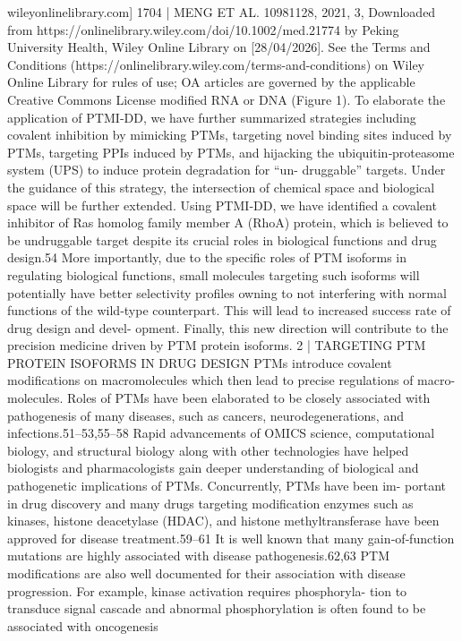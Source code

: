 wileyonlinelibrary.com]
1704 |
MENG ET AL.
 10981128, 2021, 3, Downloaded from https://onlinelibrary.wiley.com/doi/10.1002/med.21774 by Peking University Health, Wiley Online Library on [28/04/2026]. See the Terms and Conditions (https://onlinelibrary.wiley.com/terms-and-conditions) on Wiley Online Library for rules of use; OA articles are governed by the applicable Creative Commons License
modified RNA or DNA (Figure 1). To elaborate the application of PTMI‐DD, we have further summarized strategies
including covalent inhibition by mimicking PTMs, targeting novel binding sites induced by PTMs, targeting PPIs
induced by PTMs, and hijacking the ubiquitin‐proteasome system (UPS) to induce protein degradation for “un-
druggable” targets. Under the guidance of this strategy, the intersection of chemical space and biological space will
be further extended. Using PTMI‐DD, we have identified a covalent inhibitor of Ras homolog family member A
(RhoA) protein, which is believed to be undruggable target despite its crucial roles in biological functions and drug
design.54 More importantly, due to the specific roles of PTM isoforms in regulating biological functions, small
molecules targeting such isoforms will potentially have better selectivity profiles owning to not interfering with
normal functions of the wild‐type counterpart. This will lead to increased success rate of drug design and devel-
opment. Finally, this new direction will contribute to the precision medicine driven by PTM protein isoforms.
2
|
TARGETING PTM PROTEIN ISOFORMS IN DRUG DESIGN
PTMs introduce covalent modifications on macromolecules which then lead to precise regulations of macro-
molecules. Roles of PTMs have been elaborated to be closely associated with pathogenesis of many diseases, such
as cancers, neurodegenerations, and infections.51–53,55–58 Rapid advancements of OMICS science, computational
biology, and structural biology along with other technologies have helped biologists and pharmacologists gain
deeper understanding of biological and pathogenetic implications of PTMs. Concurrently, PTMs have been im-
portant in drug discovery and many drugs targeting modification enzymes such as kinases, histone deacetylase
(HDAC), and histone methyltransferase have been approved for disease treatment.59–61 It is well known that many
gain‐of‐function mutations are highly associated with disease pathogenesis.62,63 PTM modifications are also well
documented for their association with disease progression. For example, kinase activation requires phosphoryla-
tion to transduce signal cascade and abnormal phosphorylation is often found to be associated with oncogenesis
